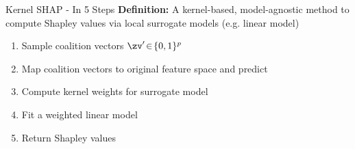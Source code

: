 \documentclass[10pt,compress,t,notes=noshow, xcolor=table]{beamer}
\begin{document}
\begin{framev}[align=top]{Kernel SHAP - In 5 Steps}
\textbf{Definition:} A kernel-based, model-agnostic method to compute Shapley values via local surrogate models (e.g. linear model)\\
\spacer[0.25]
\begin{enumerate}
\item Sample coalition vectors \(\zv'\!\in\!\{0,1\}^p\)
\item Map coalition vectors to original feature space and predict
\item Compute kernel weights for surrogate model
\item Fit a weighted linear model
\item Return Shapley values
\end{enumerate}
\end{framev}





\end{document}

